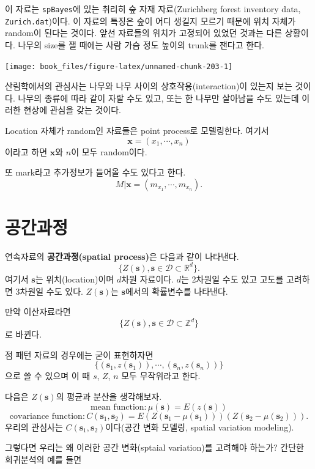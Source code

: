 \documentclass[b5paper,]{scrbook}
\theoremstyle{plain}
\theoremstyle{definition}
\numberwithin{equation}{section}
\begin{document}
이 자료는 \texttt{spBayes}에 있는 취리히 숲 자재 자료(Zurichberg forest
inventory data, \texttt{Zurich.dat})이다. 이 자료의 특징은 숲이 어디
생길지 모르기 때문에 위치 자체가 random이 된다는 것이다. 앞선 자료들의
위치가 고정되어 있었던 것과는 다른 상황이다. 나무의 size를 잴 때에는
사람 가슴 정도 높이의 trunk를 잰다고 한다.

\begin{center}\texttt{[image: book\_files/figure-latex/unnamed-chunk-203-1]} \end{center}

산림학에서의 관심사는 나무와 나무 사이의 상호작용(interaction)이 있는지
보는 것이다. 나무의 종류에 따라 같이 자랄 수도 있고, 또는 한 나무만
살아남을 수도 있는데 이러한 현상에 관심을 갖는 것이다.

Location 자체가 random인 자료들은 point process로 모델링한다. 여기서
\[\mathbf{x}=(x_{1}, \cdots , x_{n})\] 이라고 하면 \(\mathbf{x}\)와
\(n\)이 모두 random이다.

또 mark라고 추가정보가 들어올 수도 있다고 한다.
\[M|\mathbf{x}=(m_{x_{1}}, \cdots , m_{x_{n}}).\]

\chapter{공간과정}\label{spatialprocess}

연속자료의 \textbf{공간과정(spatial process)}은 다음과 같이 나타낸다.
\[\{Z (\mathbf{s}), \mathbf{s} \in \mathcal{D} \subset \mathbb{R}^{d} \} .\]
여기서 \(\mathbf{s}\)는 위치(location)이며 \(d\)차원 자료이다. \(d\)는
2차원일 수도 있고 고도를 고려하면 3차원일 수도 있다. \(Z(\mathbf{s})\)는
\(\mathbf{s}\)에서의 확률변수를 나타낸다.

만약 이산자료라면
\[\{Z (\mathbf{s}), \mathbf{s} \in \mathcal{D} \subset \mathbb{Z}^{d} \} \]
로 바뀐다.

점 패턴 자료의 경우에는 굳이 표현하자면
\[\{ (\mathbf{s}_{1},z(\mathbf{s}_{1})), \cdots , (\mathbf{s}_{n},z(\mathbf{s}_{n}))  \} \]
으로 쓸 수 있으며 이 때 \(s\), \(Z\), \(n\) 모두 무작위라고 한다.

다음은 \(Z(\mathbf{s})\)의 평균과 분산을 생각해보자.
\[\text{mean function}:\mu(\mathbf{s})=E(z(\mathbf{s}))\]
\[\text{covariance function}: C(\mathbf{s}_{1},\mathbf{s}_{2})=E(Z(\mathbf{s}_{1}-\mu(\mathbf{s}_{1})))(Z(\mathbf{s}_{2}-\mu(\mathbf{s}_{2}))).\]
우리의 관심사는 \(C(\mathbf{s}_{1},\mathbf{s}_{2})\)이다(공간 변화
모델링, spatial variation modeling).

그렇다면 우리는 왜 이러한 공간 변화(sptaial variation)를 고려해야
하는가? 간단한 회귀분석의 예를 들면
\end{document}
